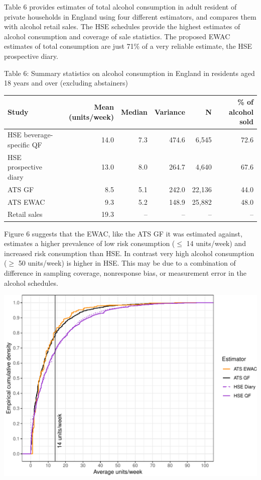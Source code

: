 \documentclass[]{article}
\begin{document}
Table 6 provides estimates of total alcohol consumption in adult
resident of private households in England using four different
estimators, and compares them with alcohol retail sales. The HSE
schedules provide the highest estimates of alcohol consumption and
coverage of sale statistics. The proposed EWAC estimates of total
consumption are just 71\% of a very reliable estimate, the HSE
prospective diary.

Table 6: Summary statistics on alcohol consumption in England in
residents aged 18 years and over (excluding abstainers)

\begin{longtable}[]{@{}lrrrrr@{}}
\toprule
Study & Mean (units/week) & Median & Variance & N & \% of alcohol
sold\tabularnewline
\midrule
\endhead
HSE beverage-specific QF & 14.0 & 7.3 & 474.6 & 6,545 &
72.6\tabularnewline
HSE prospective diary & 13.0 & 8.0 & 264.7 & 4,640 & 67.6\tabularnewline
ATS GF & 8.5 & 5.1 & 242.0 & 22,136 & 44.0\tabularnewline
ATS EWAC & 9.3 & 5.2 & 148.9 & 25,882 & 48.0\tabularnewline
Retail sales & 19.3 & -- & -- & -- & --\tabularnewline
\bottomrule
\end{longtable}

Figure 6 suggests that the EWAC, like the ATS GF it was estimated
against, estimates a higher prevalence of low risk consumption (\(\leq\)
14 units/week) and increased risk consumption than HSE. In contrast very
high alcohol consumption (\(\geq\) 50 units/week) is higher in HSE. This
may be due to a combination of difference in sampling coverage,
nonresponse bias, or measurement error in the alcohol schedules.

\includegraphics{analysis_files/figure-latex/ggplot_ECDF-1.pdf}
\end{document}
